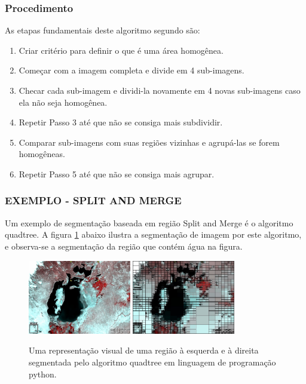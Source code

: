 \subsubsection*{Procedimento}
As etapas fundamentais deste algoritmo segundo  são: 
\begin{enumerate}
    \item Criar critério para definir o que é uma área homogênea.
    \item Começar com a imagem completa e divide em 4 sub-imagens.
    \item Checar cada sub-imagem e dividi-la novamente em 4 novas sub-imagens caso ela não seja homogênea.
    \item Repetir Passo 3 até que não se consiga mais subdividir.
    \item Comparar sub-imagens com suas regiões vizinhas e agrupá-las se forem homogêneas.
    \item Repetir Passo 5 até que não se consiga mais agrupar.
\end{enumerate}

\subsubsection*{EXEMPLO - SPLIT AND MERGE}
Um exemplo de segmentação baseada em região Split and Merge é o algoritmo quadtree. A figura \ref{fig:aral} abaixo ilustra a segmentação de imagem por este algoritmo, e observa-se a segmentação da região que contém água na figura.

\begin{figure}[!htb]
 \centering
 \def\baselinestretch{1}\small\normalsize
 \includegraphics[width=0.4\textwidth]{img/stf-aral1997.jpg}\qquad
 \includegraphics[width=0.4\textwidth]{img/stf-aral1997-quadtree.jpg} 
 \caption{\label{fig:aral}Uma representação visual de uma região \citep{stanford} à esquerda e à direita segmentada pelo algoritmo quadtree em linguagem de programação python.}
\end{figure}

